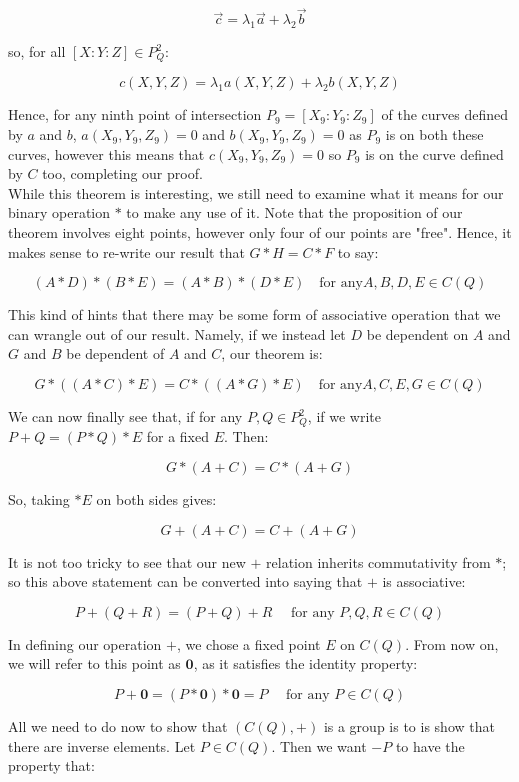 \documentclass{article}
\begin{document}
\[\vec{c} = \lambda_1 \vec{a} + \lambda_2 \vec{b}\]

so, for all $[X : Y: Z] \in P_Q^2$:

\[c(X, Y, Z) = \lambda_1 a(X, Y, Z) + \lambda_2 b(X, Y, Z)\]

Hence, for any ninth point of intersection $P_9 = [X_9 : Y_9 : Z_9]$ of the curves defined by $a$ and $b$, $a(X_9, Y_9, Z_9) = 0$ and $b(X_9, Y_9, Z_9) = 0$ as $P_9$ is on both these curves, however this means that $c(X_9, Y_9, Z_9) = 0$ so $P_9$ is on the curve defined by $C$ too, completing our proof. \\

While this theorem is interesting, we still need to examine what it means for our binary operation $*$ to make any use of it. Note that the proposition of our theorem involves eight points, however only four of our points are "free". Hence, it makes sense to re-write our result that $G * H = C * F$ to say:

\[(A * D) * (B * E) = (A * B) * (D * E) \quad \text{for any} A, B, D, E \in C(Q)\]

This kind of hints that there may be some form of associative operation that we can wrangle out of our result. Namely, if we instead let $D$ be dependent on $A$ and $G$ and $B$ be dependent of $A$ and $C$, our theorem is:

\[G * ((A * C) * E) = C * ((A * G) * E) \quad \text{for any} A,  C, E, G \in C(Q)\]

We can now finally see that, if for any $P, Q \in P_Q^2$, if we write $P + Q = (P * Q) * E$ for a fixed $E$. Then:

\[G * (A + C) = C * (A + G)\]

So, taking $* E$ on both sides gives:

\[G + (A + C) = C + (A + G)\]

It is not too tricky to see that our new $+$ relation inherits commutativity from $*$; so this above statement can be converted into saying that $+$ is associative:

\[P + (Q + R) = (P + Q) + R \quad \text{ for any } P, Q, R \in C(Q)\]

In defining our operation $+$, we chose a fixed point $E$ on $C(Q)$. From now on, we will refer to this point as $\mathbf{0}$, as it satisfies the identity property:

\[P + \mathbf{0} = (P * \mathbf{0}) * \mathbf{0} = P \quad \text{ for any } P \in C(Q)\]

All we need to do now to show that $(C(Q), +)$ is a group is to is show that there are inverse elements. Let $P \in C(Q)$. Then we want $-P$ to have the property that:
\end{document}
